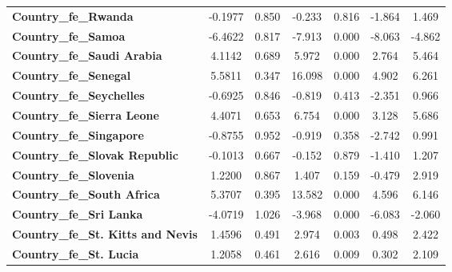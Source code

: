 \begin{center}
\begin{tabular}{lcccccc}
\textbf{Country\_fe\_Rwanda}                         &      -0.1977  &        0.850     &    -0.233  &         0.816        &       -1.864    &        1.469     \\
\textbf{Country\_fe\_Samoa}                          &      -6.4622  &        0.817     &    -7.913  &         0.000        &       -8.063    &       -4.862     \\
\textbf{Country\_fe\_Saudi Arabia}                   &       4.1142  &        0.689     &     5.972  &         0.000        &        2.764    &        5.464     \\
\textbf{Country\_fe\_Senegal}                        &       5.5811  &        0.347     &    16.098  &         0.000        &        4.902    &        6.261     \\
\textbf{Country\_fe\_Seychelles}                     &      -0.6925  &        0.846     &    -0.819  &         0.413        &       -2.351    &        0.966     \\
\textbf{Country\_fe\_Sierra Leone}                   &       4.4071  &        0.653     &     6.754  &         0.000        &        3.128    &        5.686     \\
\textbf{Country\_fe\_Singapore}                      &      -0.8755  &        0.952     &    -0.919  &         0.358        &       -2.742    &        0.991     \\
\textbf{Country\_fe\_Slovak Republic}                &      -0.1013  &        0.667     &    -0.152  &         0.879        &       -1.410    &        1.207     \\
\textbf{Country\_fe\_Slovenia}                       &       1.2200  &        0.867     &     1.407  &         0.159        &       -0.479    &        2.919     \\
\textbf{Country\_fe\_South Africa}                   &       5.3707  &        0.395     &    13.582  &         0.000        &        4.596    &        6.146     \\
\textbf{Country\_fe\_Sri Lanka}                      &      -4.0719  &        1.026     &    -3.968  &         0.000        &       -6.083    &       -2.060     \\
\textbf{Country\_fe\_St. Kitts and Nevis}            &       1.4596  &        0.491     &     2.974  &         0.003        &        0.498    &        2.422     \\
\textbf{Country\_fe\_St. Lucia}                      &       1.2058  &        0.461     &     2.616  &         0.009        &        0.302    &        2.109     \\

\end{tabular}
\end{center}
